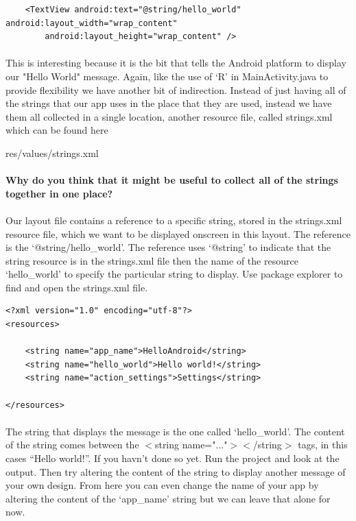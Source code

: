\documentclass[12pt, a4paper, twoside]{book}
\begin{document}
\begin{lstlisting}    <TextView android:text="@string/hello_world" android:layout_width="wrap_content"
        android:layout_height="wrap_content" />
\end{lstlisting}

\paragraph{} This is interesting because it is the bit that tells the Android platform to display our "Hello World" message. Again, like the use of `R' in MainActivity.java to provide flexibility we have another bit of indirection. Instead of just having all of the strings that our app uses in the place that they are used, instead we have them all collected in a single location, another resource file, called strings.xml which can be found here

\begin{framed}
res/values/strings.xml
\end{framed}

\paragraph{} {\bf{Why do you think that it might be useful to collect all of the strings together in one place?}}

\paragraph{} Our layout file contains a reference to a specific string, stored in the strings.xml resource file, which we want to be displayed onscreen in this layout. The reference is the `@string/hello\_world'. The reference uses `@string' to indicate that the string resource is in the strings.xml file then the name of the resource `hello\_world' to specify the particular string to display. Use package explorer to find and open the strings.xml file.

\begin{lstlisting}
<?xml version="1.0" encoding="utf-8"?>
<resources>

    <string name="app_name">HelloAndroid</string>
    <string name="hello_world">Hello world!</string>
    <string name="action_settings">Settings</string>

</resources>
\end{lstlisting}

\paragraph{} The string that displays the message is the one called `hello\_world'. The content of the string comes between the $<$string name="..."$>$$<$/string$>$ tags, in this cases ``Hello world!''. If you havn't done so yet. Run the project and look at the output. Then try altering the content of the string to display another message of your own design. From here you can even change the name of your app by altering the content of the `app\_name' string but we can leave that alone for now.
\end{document}
